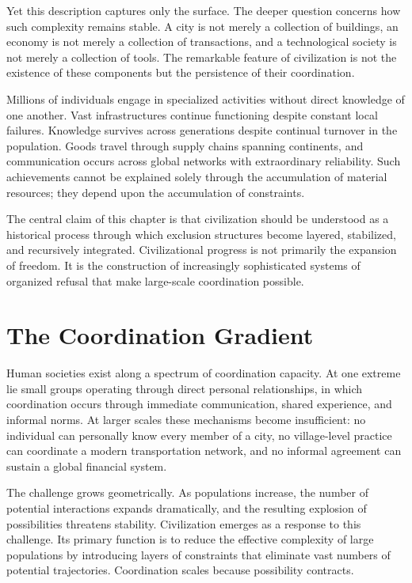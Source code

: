 \documentclass[11pt,oneside]{book}
\theoremstyle{plain}
\theoremstyle{definition}
\theoremstyle{remark}
\begin{document}
Yet this description captures only the surface. The deeper question concerns how such complexity remains stable. A city is not merely a collection of buildings, an economy is not merely a collection of transactions, and a technological society is not merely a collection of tools. The remarkable feature of civilization is not the existence of these components but the persistence of their coordination.

Millions of individuals engage in specialized activities without direct knowledge of one another. Vast infrastructures continue functioning despite constant local failures. Knowledge survives across generations despite continual turnover in the population. Goods travel through supply chains spanning continents, and communication occurs across global networks with extraordinary reliability. Such achievements cannot be explained solely through the accumulation of material resources; they depend upon the accumulation of constraints.

The central claim of this chapter is that civilization should be understood as a historical process through which exclusion structures become layered, stabilized, and recursively integrated. Civilizational progress is not primarily the expansion of freedom. It is the construction of increasingly sophisticated systems of organized refusal that make large-scale coordination possible.

\section{The Coordination Gradient}

Human societies exist along a spectrum of coordination capacity. At one extreme lie small groups operating through direct personal relationships, in which coordination occurs through immediate communication, shared experience, and informal norms. At larger scales these mechanisms become insufficient: no individual can personally know every member of a city, no village-level practice can coordinate a modern transportation network, and no informal agreement can sustain a global financial system.

The challenge grows geometrically. As populations increase, the number of potential interactions expands dramatically, and the resulting explosion of possibilities threatens stability. Civilization emerges as a response to this challenge. Its primary function is to reduce the effective complexity of large populations by introducing layers of constraints that eliminate vast numbers of potential trajectories. Coordination scales because possibility contracts.
\end{document}
